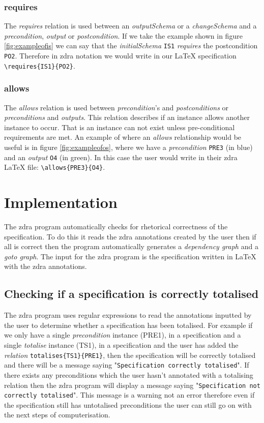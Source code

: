 \subsubsection{requires}
The \emph{requires} relation is used between an \emph{outputSchema} or a
\emph{changeSchema} and a \emph{precondition}, \emph{output} or
\emph{postcondition}. If we take the example shown in figure
\ref{fig:exampleofis} we can say that the \emph{initialSchema} \verb|IS1|
\emph{requires} the postcondition \verb|PO2|. Therefore in \gls{zdra} notation
we would write in our \LaTeX{} specification \verb|\requires{IS1}{PO2}|.

\subsubsection{allows}
The \emph{allows} relation is used between \emph{precondition}'s and
\emph{postconditions} or \emph{preconditions} and \emph{outputs}. This relation
describes if an instance allows another instance to occur. That is an instance
can not exist unless pre-conditional requirements are met. An example of where
an \emph{allows} relationship would be useful is in figure
\ref{fig:exampleofos}, where we have a \emph{precondition} \verb|PRE3| (in blue)
and an \emph{output} \verb|O4| (in green). In this case the user would write in
their \gls{zdra} \LaTeX{} file: \verb|\allows{PRE3}{O4}|.


\section{Implementation}
\label{sec:zdra_implement}

The \gls{zdra} program automatically checks for rhetorical correctness of the
specification. To do this it reads the \gls{zdra} annotations created by the
user then if all is correct then the program automatically generates a
\emph{dependency graph} and a \emph{goto graph}. The input for the \gls{zdra}
program is the specification written in \LaTeX{} with the \gls{zdra}
annotations.

\subsection{Checking if a specification is correctly totalised}

The \gls{zdra} program uses regular expressions to read the annotations inputted
by the user to determine whether a specification has been totalised. For example
if we only have a single \emph{precondition} instance (PRE1), in a specification
and a single \emph{totalise} instance (TS1), in a specification and the user has
added the \emph{relation} \verb|totalises{TS1}{PRE1}|, then the specification
will be correctly totalised and there will be a message saying
"\texttt{Specification correctly totalised}". If there exists any preconditions
which the user hasn't annotated with a totalising relation then the \gls{zdra}
program will display a message saying "\texttt{Specification not correctly
totalised}". This message is a warning not an error therefore even if the
specification still has untotalised preconditions the user can still go on with
the next steps of computerisation.

